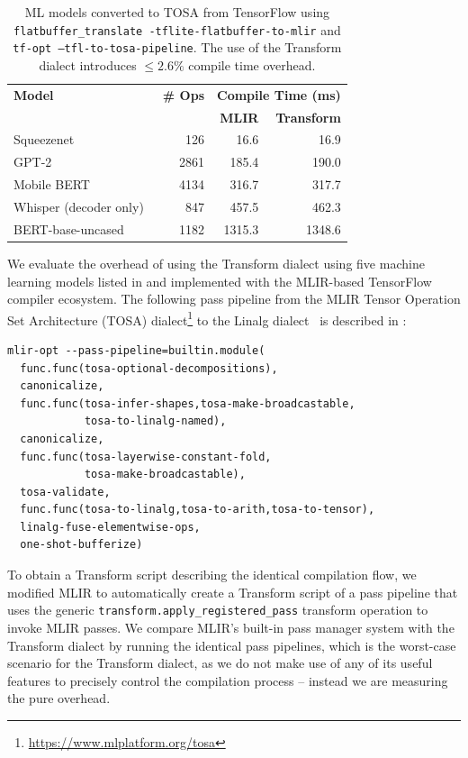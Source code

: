 \documentclass[screen,nonacm,authorversion]{acmart}
\begin{document}
\begin{table}
{\small
\begin{tabular}{lrrr}
\toprule
\textbf{Model} & \textbf{\# Ops} & \multicolumn{2}{c}{\textbf{Compile Time (ms)}} \\
 & & \textbf{MLIR} & \textbf{Transform} \\\midrule
Squeezenet~\cite{iandola2016squeezenet} & 126   & 16.6 & 16.9 \\
GPT-2~\cite{radford2019language} & 2861  & 185.4 & 190.0 \\
Mobile BERT~\cite{sun2020mobilebert} &4134  & 316.7 & 317.7 \\
Whisper (decoder only)~\cite{pmlr-v202-radford23a} & 847  & 457.5 & 462.3 \\
BERT-base-uncased~\cite{DBLP:journals/corr/abs-1810-04805} & 1182   & 1315.3 & 1348.6 \\
\bottomrule
\end{tabular}
}
\caption{\label{tab:pipeline_models} ML models converted to TOSA from TensorFlow using
\texttt{\scriptsize flatbuffer\_translate -tflite-flatbuffer-to-mlir} and \texttt{\scriptsize tf-opt --tfl-to-tosa-pipeline}. The use of the Transform dialect introduces $\leq 2.6\%$ compile time overhead.}
\end{table}

We evaluate the overhead of using the Transform dialect using five machine learning models listed in  and implemented with the MLIR-based TensorFlow compiler ecosystem.
The following pass pipeline from the MLIR Tensor Operation Set Architecture (TOSA) dialect\footnote{\url{https://www.mlplatform.org/tosa}} to the Linalg dialect~\cite{linalg} is described in \cite{10.1007/978-3-031-13188-2_19}:
\noindent
{\makeatletter
\patchcmd{\@verbatim}
  {\verbatim@font}
  {\verbatim@font\fontsize{7}{7.5}\selectfont}
  {}{}
\makeatother
\begin{verbatim}
mlir-opt --pass-pipeline=builtin.module(
  func.func(tosa-optional-decompositions),
  canonicalize,
  func.func(tosa-infer-shapes,tosa-make-broadcastable,
            tosa-to-linalg-named),
  canonicalize,
  func.func(tosa-layerwise-constant-fold,
            tosa-make-broadcastable),
  tosa-validate,
  func.func(tosa-to-linalg,tosa-to-arith,tosa-to-tensor),
  linalg-fuse-elementwise-ops,
  one-shot-bufferize)
\end{verbatim}}
\noindent

To obtain a Transform script describing the identical compilation flow, we modified MLIR to automatically create a Transform script of a pass pipeline that uses the generic \texttt{transform.apply\_registered\_pass} transform operation to invoke MLIR passes.
We compare MLIR's built-in pass manager system with the Transform dialect by running the identical pass pipelines, which is the worst-case scenario for the Transform dialect, as we do not make use of any of its useful features to precisely control the compilation process -- instead we are measuring the pure overhead.
\end{document}
